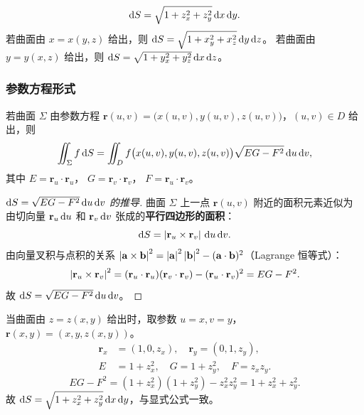 \documentclass{article}
\begin{document}
\begin{remark}[面元素公式]
  \[
    \mathrm{d} S = \sqrt{1 + z_x^2 + z_y^2} \,\mathrm{d} x\,\mathrm{d} y.
  \]
  若曲面由 $x = x(y,z)$ 给出，则 $\mathrm{d} S = \sqrt{1+x_y^2+x_z^2}\,\mathrm{d} y\,\mathrm{d} z$。
  若曲面由 $y = y(x,z)$ 给出，则 $\mathrm{d} S = \sqrt{1+y_x^2+y_z^2}\,\mathrm{d} x\,\mathrm{d} z$。
\end{remark}

\subsubsection*{参数方程形式}

若曲面 $\Sigma$ 由参数方程
$\mathbf{r}(u,v) = \bigl(x(u,v), y(u,v), z(u,v)\bigr)$，$(u,v) \in D$ 给出，则
\[
  \iint_\Sigma f \,\mathrm{d} S
  = \iint_D f\bigl(x(u,v),y(u,v),z(u,v)\bigr)
  \sqrt{EG - F^2} \,\mathrm{d} u\,\mathrm{d} v,
\]
其中 $E = \mathbf{r}_u \cdot \mathbf{r}_u$，
$G = \mathbf{r}_v \cdot \mathbf{r}_v$，
$F = \mathbf{r}_u \cdot \mathbf{r}_v$。

\begin{proof}[$\mathrm{d} S = \sqrt{EG - F^2}\,\mathrm{d} u\,\mathrm{d} v$ 的推导]
  曲面 $\Sigma$ 上一点 $\mathbf{r}(u,v)$ 附近的面积元素近似为
  由切向量 $\mathbf{r}_u\,\mathrm{d} u$ 和 $\mathbf{r}_v\,\mathrm{d} v$ 张成的\textbf{平行四边形的面积}：
  \[
    \mathrm{d} S = \left| \mathbf{r}_u \times \mathbf{r}_v \right| \,\mathrm{d} u\,\mathrm{d} v.
  \]
  由向量叉积与点积的关系 $\left| \mathbf{a} \times \mathbf{b} \right|^2
  = \left| \mathbf{a} \right|^2 \left| \mathbf{b} \right|^2 - (\mathbf{a} \cdot
  \mathbf{b})^2$（Lagrange 恒等式）：
  \[
    \left| \mathbf{r}_u \times \mathbf{r}_v \right|^2
    = (\mathbf{r}_u \cdot \mathbf{r}_u)(\mathbf{r}_v \cdot \mathbf{r}_v)
    - (\mathbf{r}_u \cdot \mathbf{r}_v)^2
    = EG - F^2.
  \]
  故 $\mathrm{d} S = \sqrt{EG - F^2}\,\mathrm{d} u\,\mathrm{d} v$。
\end{proof}

\begin{remark}
  当曲面由 $z = z(x,y)$ 给出时，取参数 $u = x, v = y$，
  $\mathbf{r}(x,y) = (x, y, z(x,y))$。
  \begin{align*}
    \mathbf{r}_x &= (1, 0, z_x), \quad
    \mathbf{r}_y = (0, 1, z_y), \\
    E &= 1 + z_x^2, \quad
    G = 1 + z_y^2, \quad
    F = z_x z_y.
  \end{align*}
  \[
    EG - F^2 = (1+z_x^2)(1+z_y^2) - z_x^2 z_y^2
    = 1 + z_x^2 + z_y^2.
  \]
  故 $\mathrm{d} S = \sqrt{1+z_x^2+z_y^2}\,\mathrm{d} x\,\mathrm{d} y$，与显式公式一致。
\end{remark}

\end{document}

